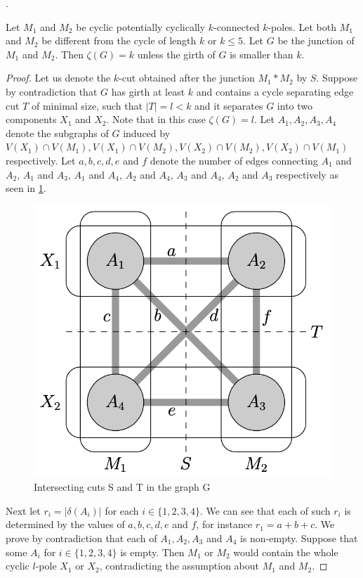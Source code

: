 \documentclass[12pt, twoside]{book}
\begin{document}
.

\begin{theorem}\label{th:junction-of-kpoles-cyclic-edge-connectivity}
	Let $M_1$ and $M_2$ be cyclic potentially cyclically $k$-connected $k$-poles. Let both $M_1$ and $M_2$ be different from the cycle of length $k$ or $k\leq 5$. Let $G$ be the junction of $M_1$ and $M_2$. Then $\zeta(G)=k$ unless the girth of $G$ is smaller than $k$.
\end{theorem}

\begin{proof}
	Let us denote the $k$-cut obtained after the junction $M_1*M_2$ by $S$. Suppose by contradiction that $G$ has girth at least $k$ and contains a cycle separating edge cut $T$ of minimal size, such that $|T|=l<k$ and it separates $G$ into two components $X_1$ and $X_2$. Note that in this case $\zeta(G)=l$. Let $A_1,A_2,A_3,A_4$ denote the subgraphs of $G$ induced by $V(X_1)\cap V(M_1), V(X_1)\cap V(M_2), V(X_2)\cap V(M_2), V(X_2)\cap V(M_1)$ respectively. Let $a,b,c,d,e$ and $f$ denote the number of edges connecting $A_1$ and $A_2$, $A_1$ and $A_3$, $A_1$ and $A_4$, $A_2$ and $A_4$, $A_3$ and $A_4$, $A_2$ and $A_3$ respectively as seen in \cref{fig:rajnik-cyclic-part-junction-illustration}.
	
	\begin{figure}
		\centering
		\includegraphics[width=0.5\linewidth]{graphs/rajnik-cyclic-part-junction-illustration}
		\caption{\cite{Rajnik_phd} Intersecting cuts S and T in the graph G}
		\label{fig:rajnik-cyclic-part-junction-illustration}
	\end{figure}
	
	Next let $r_i=|\delta(A_i)|$ for each $i\in\{1,2,3,4\}$. We can see that each of such $r_i$ is determined by the values of $a,b,c,d,e$ and $f$, for instance $r_1=a+b+c$. We prove by contradiction that each of $A_1, A_2,A_3$ and $A_4$ is non-empty. Suppose that some $A_i$ for $i\in\{1,2,3,4\}$ is empty. Then $M_1$ or $M_2$ would contain the whole cyclic $l$-pole $X_1$ or $X_2$, contradicting the assumption about $M_1$ and $M_2$.
	

\end{proof}
\end{document}
